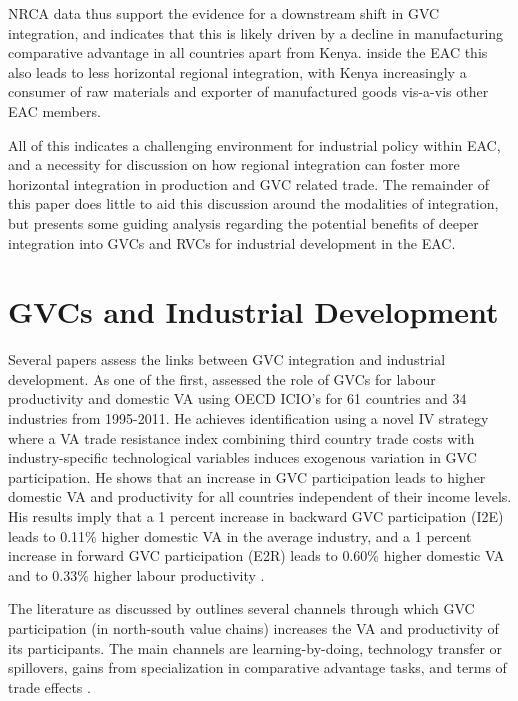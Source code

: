 \documentclass[a4paper]{article}
\begin{document}

NRCA data thus support the evidence for a downstream shift in GVC integration, and indicates that this is likely driven by a decline in manufacturing comparative advantage in all countries apart from Kenya. inside the EAC this also leads to less horizontal regional integration, with Kenya increasingly a consumer of raw materials and exporter of manufactured goods vis-a-vis other EAC members. \newline

All of this indicates a challenging environment for industrial policy within EAC, and a necessity for discussion on how regional integration can foster more horizontal integration in production and GVC related trade. The remainder of this paper does little to aid this discussion around the modalities of integration, but presents some guiding analysis regarding the potential benefits of deeper integration into GVCs and RVCs for industrial development in the EAC. 





\section{GVCs and Industrial Development}
Several papers assess the links between GVC integration and industrial development. As one of the first, \citet{Kummritz20161} assessed the role of GVCs for labour productivity and domestic VA using OECD ICIO's for 61 countries and 34 industries from 1995-2011. He achieves identification using a novel IV strategy where a VA trade resistance index combining third country trade costs with industry-specific technological variables induces exogenous variation in GVC participation. He shows that an increase in GVC participation leads to higher domestic VA and productivity for all countries independent of their income levels. His results imply that a 1 percent increase in backward GVC participation (I2E) leads to 0.11\% higher domestic VA in the average industry, and  a 1 percent increase in forward GVC participation (E2R) leads to 0.60\% higher domestic VA and to 0.33\% higher labour productivity \citep{Kummritz20161}. \newline


The literature as discussed by \citet{Kummritz20161} outlines several channels through which GVC participation (in north-south value chains) increases the VA and productivity of its participants. The main channels are learning-by-doing, technology transfer or spillovers, gains from specialization in comparative advantage tasks, and terms of trade effects  \citep{Kummritz20161}. \newline
\end{document}
